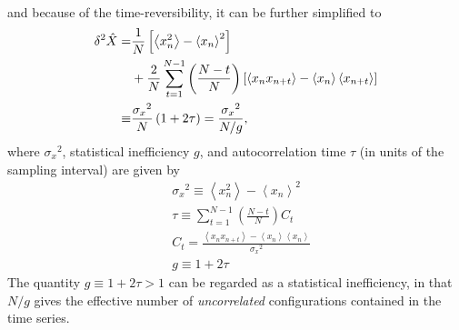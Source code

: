 \begin{appendices}
\begin{align}
\end{align}
and because of the time-reversibility, it can be further simplified to
\begin{align}
	\delta^2 \hat X=& \frac 1N\left[\left<x_n^2\right>-\left<x_n\right>^2\right] \notag\\
	&+\frac 2N\sum\limits_{t=1}^{N-1}\left(\frac{N-t}{N}\right)\left[\left<x_nx_{n+t}\right>-\left<x_n\right>\left<x_{n+t}\right>\right]\notag\\
	\equiv &\frac{{\sigma_x}^2}{N}\left(1+2\tau\right)=\frac{{\sigma_x}^2}{N/g},
\end{align}
where ${\sigma_x}^2$, statistical inefficiency $g$, and autocorrelation time $\tau$ (in units of the sampling interval) are given by
\begin{align}
	&{\sigma_x}^2 \equiv \left<x_n^2\right>-\left<x_n\right>^2\\
	&\tau \equiv \sum\limits_{t=1}^{N-1}\left(\frac{N-t}{N}\right)C_t\\
	&C_t=\frac{\left<x_nx_{n+t}\right>-\left<x_n\right>\left<x_n\right>}{{\sigma_x}^2}\\
	&g\equiv 1+2\tau
\end{align}
The quantity $g\equiv 1+2\tau>1$ can be regarded as a statistical inefficiency, in that $N/g$ gives the effective number of \textit{uncorrelated} configurations contained in the time series.


\end{appendices}
